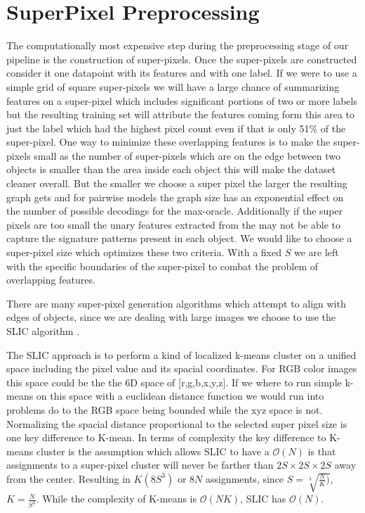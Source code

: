 
%
\chapter{SuperPixel Preprocessing}

The computationally most expensive step during the preprocessing stage of our pipeline is the construction of super-pixels. Once the super-pixels are constructed consider it one datapoint with its features and with one label. If we were to use a simple grid of square super-pixels we will have a large chance of summarizing features on a super-pixel which includes significant portions of two or more labels but the resulting training set will attribute the features coming form this area to just the label which had the highest pixel count even if that is only 51\% of the super-pixel. One way to minimize these overlapping features is to make the super-pixels small as the number of super-pixels which are on the edge between two objects is smaller than the area inside each object this will make the dataset cleaner overall. But the smaller we choose a super pixel the larger the resulting graph gets and for pairwise models the graph size has an exponential effect on the number of possible decodings for the max-oracle. Additionally if the super pixels are too small the unary features extracted from the may not be able to capture the signature patterns present in each object. We would like to choose a super-pixel size which optimizes these two criteria. With a fixed $S$ we are left with the specific boundaries of the super-pixel to combat the problem of overlapping features.

There are many super-pixel generation algorithms which attempt to align with edges of objects, since we are dealing with large images we choose to use the SLIC algorithm \cite{slicPaper}. 

\par
The SLIC approach is to perform a kind of localized k-means cluster on a unified space including the pixel value and its spacial coordinates. For RGB color images this space could be the the 6D space of [r,g,b,x,y,z]. If we where to run simple k-means on this space with a euclidean distance function we would run into problems do to the RGB space being bounded while the xyz space is not. Normalizing the spacial distance proportional to the selected super pixel size is one key difference to K-mean. In terms of complexity the key difference to K-means cluster is the assumption which allows SLIC to have a $\mathcal{O}(N)$ is that assignments to a super-pixel cluster will never be farther than $2S \times 2S \times 2S$ away from the center.  Resulting in $K(8S^3)$ or $8N$ assignments, since $S= \sqrt[3]{\frac{N}{K})}$, $K= \frac{N}{S^3}$. While the complexity of K-means is $\mathcal{O}(NK)$, SLIC has $\mathcal{O}(N)$. 



